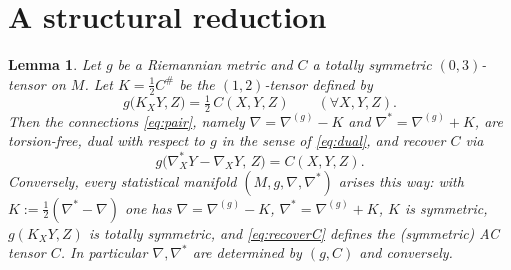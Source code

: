 \documentclass{amsart}
\newtheorem{lemma}{Lemma}
\theoremstyle{definition}
\theoremstyle{remark}
\begin{document}
\section{A structural reduction}

\begin{lemma}\label{lem:reduce}
Let $g$ be a Riemannian metric and $C$ a totally symmetric $(0,3)$-tensor on $M$.
Let $K=\tfrac12 C^{\#}$ be the $(1,2)$-tensor defined by
\begin{equation}\label{eq:Kdef}
  g\bigl(K_{X}Y,Z\bigr)=\tfrac12\,C(X,Y,Z)\qquad(\forall X,Y,Z).
\end{equation}
Then the connections \eqref{eq:pair}, namely
$\nabla=\nabla^{(g)}-K$ and $\nabla^{*}=\nabla^{(g)}+K$, are torsion-free, dual
with respect to $g$ in the sense of \eqref{eq:dual}, and recover $C$ via
\begin{equation}\label{eq:recoverC}
  g\bigl(\nabla^{*}_{X}Y-\nabla_{X}Y,\,Z\bigr)=C(X,Y,Z).
\end{equation}
Conversely, every statistical manifold $(M,g,\nabla,\nabla^{*})$ arises this way:
with $K:=\tfrac12(\nabla^{*}-\nabla)$ one has $\nabla=\nabla^{(g)}-K$,
$\nabla^{*}=\nabla^{(g)}+K$, $K$ is symmetric, $g(K_{X}Y,Z)$ is totally
symmetric, and \eqref{eq:recoverC} defines the (symmetric) AC tensor $C$. In
particular $\nabla,\nabla^{*}$ are determined by $(g,C)$ and conversely.
\end{lemma}
\end{document}
